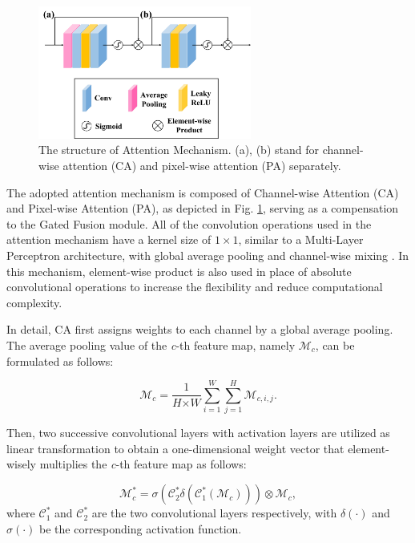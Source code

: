 \documentclass[lettersize,journal]{IEEEtran}
\begin{document}
\begin{figure}[H]
    \centering
    \includegraphics[width=7cm]{figure2.png}
    \caption{The structure of Attention Mechanism. (a), (b) stand for channel-wise attention (CA) and pixel-wise attention (PA) separately. }
    \label{attention}
\end{figure}

The adopted attention mechanism is composed of Channel-wise Attention (CA) and Pixel-wise Attention (PA), as depicted in Fig. \ref{attention}, serving as a compensation to the Gated Fusion module. All of the convolution operations used in the attention mechanism have a kernel size of $1 \times 1$, similar to a Multi-Layer Perceptron architecture, with global average pooling and channel-wise mixing \cite{NEURIPS2021_mlp}. In this mechanism, element-wise product is also used in place of absolute convolutional operations to increase the flexibility and reduce computational complexity.

In detail, CA first assigns weights to each channel by a global average pooling. The average pooling value of the \textit{c}-th feature map, namely $\mathcal{M}_{c}$, can be formulated as follows:

\begin{equation}
    \mathcal{M}_{c} = \frac{1}{\textit{H} \times \textit{W}} \sum_{i=1}^\textit{W} \sum_{j=1}^\textit{H} \mathcal{M}_{c,i,j}.
\end{equation}

Then, two successive convolutional layers with activation layers are utilized as linear transformation to obtain a one-dimensional weight vector that element-wisely multiplies the \textit{c}-th feature map as follows:

\begin{equation}
    \mathcal{M}_c^* = \sigma(\mathcal{C}_2^* \delta (\mathcal{C}_1^*(\mathcal{M}_c))) \otimes \mathcal{M}_c,
\end{equation}
where $\mathcal{C}_1^*$ and $\mathcal{C}_2^*$ are the two convolutional layers respectively, with $\delta(\cdot)$ and $\sigma(\cdot)$ be the corresponding activation function. 
\end{document}
